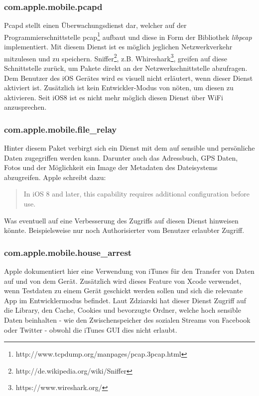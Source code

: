 		\subsubsection{com.apple.mobile.pcapd}
			Pcapd stellt einen Überwachungsdienst dar, welcher auf der
			Programmierschnittstelle
			pcap\footnote{http://www.tcpdump.org/manpages/pcap.3pcap.html} aufbaut und
			diese in Form der Bibliothek \textsl{libpcap} implementiert. Mit diesem
			Dienst ist es möglich jeglichen Netzwerkverkehr mitzulesen und zu speichern.
			Sniffer\footnote{http://de.wikipedia.org/wiki/Sniffer}, z.B.
			Whireshark\footnote{https://www.wireshark.org/}, greifen auf diese
			Schnittstelle zurück, um Pakete direkt an der Netzwerkschnittstelle
			abzufragen. Dem Benutzer des iOS Gerätes wird es visuell nicht erläutert,
			wenn dieser Dienst aktiviert ist. Zusätzlich ist kein Entwickler-Modus von
			nöten, um diesen zu aktivieren. Seit iOS8 ist es nicht mehr möglich diesen
			Dienst über WiFi anzusprechen.
		\subsubsection{com.apple.mobile.file\_relay}
			Hinter diesem Paket verbirgt sich ein Dienst mit dem auf sensible und
			persönliche Daten zugegriffen werden kann. Darunter auch das Adressbuch, GPS
			Daten, Fotos und der Möglichkeit ein Image der Metadaten des Dateisystems
			abzugreifen. Apple schreibt dazu:
			\begin{quote}
				In iOS 8 and later, this capability requires additional configuration before
				use.\cite{AppleDiagnosticCap2015}
			\end{quote}
			Was eventuell auf eine Verbesserung des Zugriffs auf diesen Dienst hinweisen
			könnte. Beispielsweise nur noch Authorisierter vom Benutzer erlaubter
			Zugriff.
		\subsubsection{com.apple.mobile.house\_arrest}
			Apple dokumentiert hier eine Verwendung von iTunes für den Transfer von Daten
			auf und von dem Gerät. Zusätzlich wird dieses Feature von Xcode verwendet,
			wenn Testdaten zu einem Gerät geschickt werden sollen und sich die relevante
			App im Entwicklermodus befindet. Laut Zdziarski hat dieser Dienst Zugriff auf
			die Library, den Cache, Cookies und bevorzugte Ordner, welche hoch sensible
			Daten beinhalten - wie den Zwischenspeicher des sozialen Streams von Facebook
			oder Twitter - obwohl die iTunes GUI dies nicht erlaubt.
			
